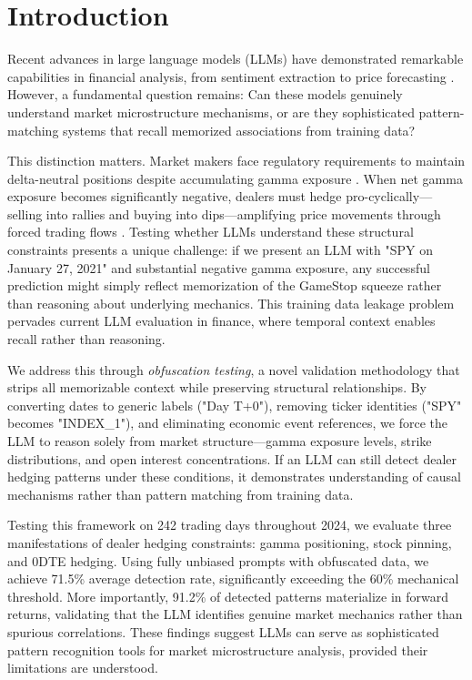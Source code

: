 \section{Introduction}

Recent advances in large language models (LLMs) have demonstrated remarkable capabilities in financial analysis, from sentiment extraction to price forecasting \cite{lopez2023can,chen2023fingpt}. However, a fundamental question remains: Can these models genuinely understand market microstructure mechanisms, or are they sophisticated pattern-matching systems that recall memorized associations from training data?

This distinction matters. Market makers face regulatory requirements to maintain delta-neutral positions despite accumulating gamma exposure \cite{sec15c31}. When net gamma exposure becomes significantly negative, dealers must hedge pro-cyclically—selling into rallies and buying into dips—amplifying price movements through forced trading flows \cite{ni2005stock,garleanu2009demand}. Testing whether LLMs understand these structural constraints presents a unique challenge: if we present an LLM with "SPY on January 27, 2021" and substantial negative gamma exposure, any successful prediction might simply reflect memorization of the GameStop squeeze rather than reasoning about underlying mechanics. This training data leakage problem pervades current LLM evaluation in finance, where temporal context enables recall rather than reasoning.

We address this through \textit{obfuscation testing}, a novel validation methodology that strips all memorizable context while preserving structural relationships. By converting dates to generic labels ("Day T+0"), removing ticker identities ("SPY" becomes "INDEX\_1"), and eliminating economic event references, we force the LLM to reason solely from market structure—gamma exposure levels, strike distributions, and open interest concentrations. If an LLM can still detect dealer hedging patterns under these conditions, it demonstrates understanding of causal mechanisms rather than pattern matching from training data.

Testing this framework on 242 trading days throughout 2024, we evaluate three manifestations of dealer hedging constraints: gamma positioning, stock pinning, and 0DTE hedging. Using fully unbiased prompts with obfuscated data, we achieve 71.5\% average detection rate, significantly exceeding the 60\% mechanical threshold. More importantly, 91.2\% of detected patterns materialize in forward returns, validating that the LLM identifies genuine market mechanics rather than spurious correlations. These findings suggest LLMs can serve as sophisticated pattern recognition tools for market microstructure analysis, provided their limitations are understood.